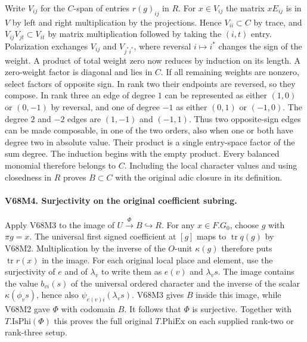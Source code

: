 Write $V_{ij}$ for the $C$-span of entries $r(g)_{ij}$ in $R$. For
$x\in V_{ij}$ the matrix $xE_{ij}$ is in $V$ by left and right
multiplication by the projections. Hence $V_{ii}\subset C$ by trace,
and $V_{ij}V_{jt}\subset V_{it}$ by matrix multiplication followed by
taking the $(i,t)$ entry. Polarization exchanges $V_{ij}$ and
$V_{j^*i^*}$, where reversal $i\mapsto i^*$ changes the sign of the
weight. A product of total weight zero now reduces by induction on
its length. A zero-weight factor is diagonal and lies in $C$. If all
remaining weights are nonzero, select factors of opposite sign. In
rank two their endpoints are reversed, so they compose. In rank three
an edge of degree $1$ can be represented as either $(1,0)$ or
$(0,-1)$ by reversal, and one of degree $-1$ as either $(0,1)$ or
$(-1,0)$. The degree $2$ and $-2$ edges are $(1,-1)$ and $(-1,1)$.
Thus two opposite-sign edges can be made composable, in one of the
two orders, also when one or both have degree two in absolute value.
Their product is a single entry-space factor of the sum degree.
The induction begins with the empty product. Every balanced monomial
therefore belongs to $C$. Including the local character values and
using closedness in $R$ proves $B\subset C$ with the original adic
closure in its definition.

\paragraph{V68M4. Surjectivity on the original coefficient subring.}
Apply V68M3 to the image of $U\xrightarrow{\Phi} B\hookrightarrow R$.
For any $x\in F.G_0$, choose $g$ with $\pi g=x$. The universal first
signed coefficient at $[g]$ maps to $\operatorname{tr}q(g)$ by V68M2.
Multiplication by the inverse of the $O$-unit $\kappa(g)$ therefore
puts $\operatorname{tr}r(x)$ in the image. For each original local
place and element, use the surjectivity of $e$ and of $\lambda_v$ to
write them as $e(v)$ and $\lambda_v s$. The image contains the value
$b_{vi}(s)$ of the universal ordered character and the inverse of the
scalar $\kappa(\phi_v s)$, hence also $\psi_{e(v)i}(\lambda_v s)$.
V68M3 gives $B$ inside this image, while V68M2 gave $\Phi$ with
codomain $B$. It follows that $\Phi$ is surjective. Together with
$T.\mathrm{IsPhi}(\Phi)$ this proves the full original $T.\mathrm{PhiEx}$
on each supplied rank-two or rank-three setup.
